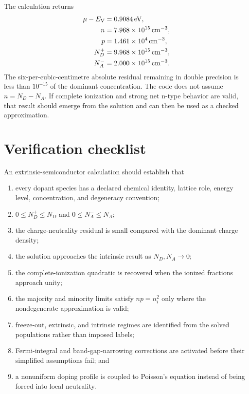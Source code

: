 The calculation returns
\begin{equation}
\begin{aligned}
  \mu-E_{\mathrm V}&=\SI{0.9084}{\electronvolt},\\
  n&=\SI{7.968e15}{\per\cubic\centi\metre},\\
  p&=\SI{1.461e4}{\per\cubic\centi\metre},\\
  N_D^+&=\SI{9.968e15}{\per\cubic\centi\metre},\\
  N_A^-&=\SI{2.000e15}{\per\cubic\centi\metre}.
\end{aligned}
  \label{eq:extrinsic-laboratory-output}
\end{equation}
The six-per-cubic-centimetre absolute residual remaining in double precision is
less than $10^{-15}$ of the dominant concentration.  The code does not assume
$n=N_D-N_A$.  If complete ionization and strong net n-type behavior are valid,
that result should emerge from the solution and can then be used as a checked
approximation.

\section{Verification checklist}

An extrinsic-semiconductor calculation should establish that
\begin{enumerate}
  \item every dopant species has a declared chemical identity, lattice role,
        energy level, concentration, and degeneracy convention;
  \item $0\le N_D^+\le N_D$ and $0\le N_A^-\le N_A$;
  \item the charge-neutrality residual is small compared with the dominant
        charge density;
  \item the solution approaches the intrinsic result as $N_D,N_A\to0$;
  \item the complete-ionization quadratic is recovered when the ionized
        fractions approach unity;
  \item the majority and minority limits satisfy $np=n_i^2$ only where the
        nondegenerate approximation is valid;
  \item freeze-out, extrinsic, and intrinsic regimes are identified from the
        solved populations rather than imposed labels;
  \item Fermi-integral and band-gap-narrowing corrections are activated before
        their simplified assumptions fail; and
  \item a nonuniform doping profile is coupled to Poisson's equation instead of
        being forced into local neutrality.
\end{enumerate}

